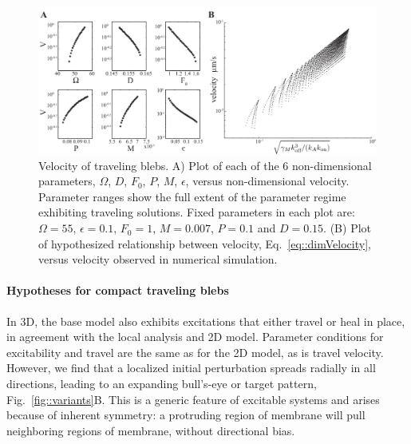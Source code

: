 \begin{figure}
   \begin{center}
   \captionsetup{width=17cm}
     \includegraphics*[width=17cm,center]{Project1/figs/figure5}
      \caption{Velocity of traveling blebs. A) Plot of each of the 6 non-dimensional parameters, $\Omega$, $D$, $F_0$, $P$, $M$, $\epsilon$, versus non-dimensional velocity. Parameter ranges show the full extent of the parameter regime exhibiting traveling solutions. Fixed parameters in each plot are: $\Omega = 55$, $\epsilon = 0.1$, $F_0 = 1$, $M = 0.007$, $P = 0.1$ and $D = 0.15$. (B) Plot of hypothesized relationship between velocity, Eq.~\ref{eq::dimVelocity}, versus velocity observed in numerical simulation.}
      \label{fig::velocity}
   \end{center}
\end{figure}

\paragraph{Hypotheses for compact traveling blebs}

In 3D, the base model also exhibits excitations that either travel or heal in place, in agreement with the local analysis and 2D model. Parameter conditions for excitability and travel are the same as for the 2D model, as is travel velocity. However, we find that a localized initial perturbation spreads radially in all directions, leading to an expanding bull's-eye or target pattern, Fig.~\ref{fig::variants}B. This is a generic feature of excitable systems and arises because of  inherent symmetry: a protruding region of membrane will pull neighboring regions of membrane, without directional bias. 

